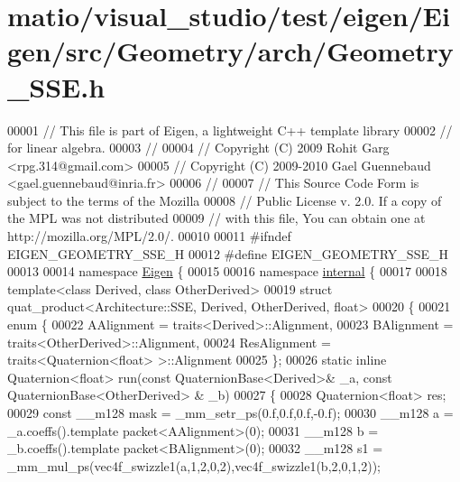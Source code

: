 \hypertarget{matio_2visual__studio_2test_2eigen_2_eigen_2src_2_geometry_2arch_2_geometry___s_s_e_8h_source}{}\section{matio/visual\+\_\+studio/test/eigen/\+Eigen/src/\+Geometry/arch/\+Geometry\+\_\+\+S\+SE.h}
\label{matio_2visual__studio_2test_2eigen_2_eigen_2src_2_geometry_2arch_2_geometry___s_s_e_8h_source}

\begin{DoxyCode}
00001 \textcolor{comment}{// This file is part of Eigen, a lightweight C++ template library}
00002 \textcolor{comment}{// for linear algebra.}
00003 \textcolor{comment}{//}
00004 \textcolor{comment}{// Copyright (C) 2009 Rohit Garg <rpg.314@gmail.com>}
00005 \textcolor{comment}{// Copyright (C) 2009-2010 Gael Guennebaud <gael.guennebaud@inria.fr>}
00006 \textcolor{comment}{//}
00007 \textcolor{comment}{// This Source Code Form is subject to the terms of the Mozilla}
00008 \textcolor{comment}{// Public License v. 2.0. If a copy of the MPL was not distributed}
00009 \textcolor{comment}{// with this file, You can obtain one at http://mozilla.org/MPL/2.0/.}
00010 
00011 \textcolor{preprocessor}{#ifndef EIGEN\_GEOMETRY\_SSE\_H}
00012 \textcolor{preprocessor}{#define EIGEN\_GEOMETRY\_SSE\_H}
00013 
00014 \textcolor{keyword}{namespace }\hyperlink{namespace_eigen}{Eigen} \{ 
00015 
00016 \textcolor{keyword}{namespace }\hyperlink{namespaceinternal}{internal} \{
00017 
00018 \textcolor{keyword}{template}<\textcolor{keyword}{class} Derived, \textcolor{keyword}{class} OtherDerived>
00019 \textcolor{keyword}{struct }quat\_product<Architecture::SSE, Derived, OtherDerived, float>
00020 \{
00021   \textcolor{keyword}{enum} \{
00022     AAlignment = traits<Derived>::Alignment,
00023     BAlignment = traits<OtherDerived>::Alignment,
00024     ResAlignment = traits<Quaternion<float> >::Alignment
00025   \};
00026   \textcolor{keyword}{static} \textcolor{keyword}{inline} Quaternion<float> run(\textcolor{keyword}{const} QuaternionBase<Derived>& \_a, \textcolor{keyword}{const} QuaternionBase<OtherDerived>
      & \_b)
00027   \{
00028     Quaternion<float> res;
00029     \textcolor{keyword}{const} \_\_m128 mask = \_mm\_setr\_ps(0.f,0.f,0.f,-0.f);
00030     \_\_m128 a = \_a.coeffs().template packet<AAlignment>(0);
00031     \_\_m128 b = \_b.coeffs().template packet<BAlignment>(0);
00032     \_\_m128 s1 = \_mm\_mul\_ps(vec4f\_swizzle1(a,1,2,0,2),vec4f\_swizzle1(b,2,0,1,2));

\end{DoxyCode}
